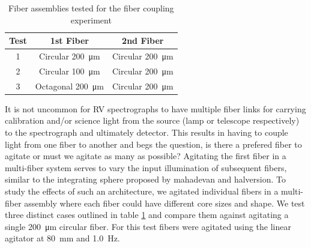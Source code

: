 \documentclass[twocolumn]{emulateapj}
\begin{document}
\begin{table}
\centering
\caption{Fiber assemblies tested for the fiber coupling experiment}
	\begin{tabular}{ccc}
	\hline
	Test & 1st Fiber & 2nd Fiber \\
	\hline \hline
	1 & Circular \SI{200}{\micro\meter} & Circular \SI{200}{\micro\meter} \\
	\hline
	2 & Circular \SI{100}{\micro\meter} & Circular \SI{200}{\micro\meter} \\
	\hline
	3 & Octagonal \SI{200}{\micro\meter} & Circular \SI{200}{\micro\meter} \\
	\hline
	\end{tabular}
\label{table:fiber_coupling}
\end{table}

It is not uncommon for RV spectrographs to have multiple fiber links for carrying calibration and/or science light from the source (lamp or telescope respectively) to the spectrograph and ultimately detector. This results in having to couple light from one fiber to another and begs the question, is there a prefered fiber to agitate or must we agitate as many as possible? Agitating the first fiber in a multi-fiber system serves to vary the input illumination of subsequent fibers, similar to the integrating sphere proposed by mahadevan and halversion. To study the effects of such an architecture, we agitated individual fibers in a multi-fiber assembly where each fiber could have different core sizes and shape. We test three distinct cases outlined in table \ref{table:fiber_coupling} and compare them against agitating a single \SI{200}{\micro\meter} circular fiber. For this test fibers were agitated using the linear agitator at \SI{80}{\milli\meter} and \SI{1.0}{\hertz}.
\end{document}
